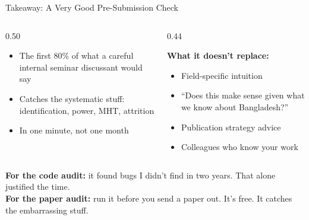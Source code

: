 \documentclass[aspectratio=169, 10pt]{beamer}
\begin{document}
\begin{frame}{Takeaway: A Very Good Pre-Submission Check}
\begin{columns}[T]
\begin{column}{0.50\textwidth}
\begin{tcolorbox}[keybox, title={\faCheck\quad What It Replaces}]
\small
\begin{itemize}\setlength{\itemsep}{3pt}
  \item The first 80\% of what a careful internal seminar discussant would say
  \item Catches the systematic stuff: identification, power, MHT, attrition
  \item In one minute, not one month
\end{itemize}
\end{tcolorbox}
\end{column}
\begin{column}{0.44\textwidth}
\begin{tcolorbox}[colback=SoftCoral!8, colframe=SoftCoral, boxrule=0.5pt, arc=3pt,
  left=6pt, right=6pt, top=4pt, bottom=4pt]
\small
\textbf{What it doesn't replace:}
\vskip3pt
\begin{itemize}\setlength{\itemsep}{2pt}
  \item Field-specific intuition
  \item ``Does this make sense given what we know about Bangladesh?''
  \item Publication strategy advice
  \item Colleagues who know your work
\end{itemize}
\end{tcolorbox}
\end{column}
\end{columns}
\vskip8pt
\begin{tcolorbox}[quotebox, width=13cm]
\small \textbf{For the code audit:} it found bugs I didn't find in two years. That alone justified the time.\\[2pt]
\textbf{For the paper audit:} run it before you send a paper out. It's free. It catches the embarrassing stuff.
\end{tcolorbox}
\end{frame}


\end{document}
